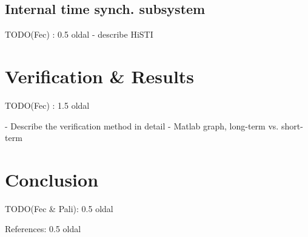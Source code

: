\documentclass[article]{IEEEtran}
\begin{document}
\subsection{Internal time synch. subsystem}
TODO(Fec) : 0.5 oldal
- describe HiSTI

\section{Verification \& Results}

TODO(Fec) : 1.5 oldal

- Describe the verification method in detail
- Matlab graph, long-term vs. short-term 


\section{Conclusion}

TODO(Fec \& Pali): 0.5 oldal


References: 0.5 oldal


%
%

%

%
%
\end{document}
